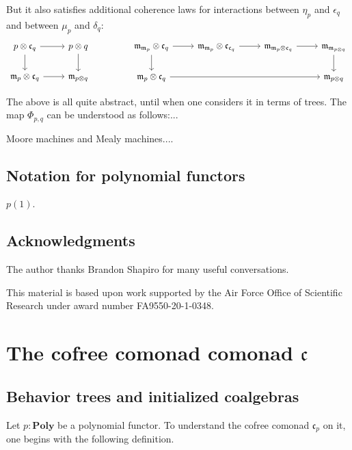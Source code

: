 \documentclass[11pt, one side, article]{memoir}
\theoremstyle{definition}
\theoremstyle{plain}
\newcommand{\Cat}[1]{\mathbf{#1}}%
\newcommand{\poly}{\Cat{Poly}}
\newcommand{\free}{\mathfrak{m}}
\newcommand{\cofree}{\mathfrak{c}}
\begin{document}
But it also satisfies additional coherence laws for interactions between $\eta_p$ and $\epsilon_q$ and between $\mu_p$ and $\delta_q$:
\[
\begin{tikzcd}
  p\otimes\cofree_q\ar[r]\ar[d]&p\otimes q\ar[d]\\
  \free_p\otimes\cofree_q\ar[r]&\free_{p\otimes q}
\end{tikzcd}
\hspace{.6in}
\begin{tikzcd}
	\free_{\free_p}\otimes\cofree_q\ar[d]\ar[r]&
	\free_{\free_p}\otimes\cofree_{\cofree_q}\ar[r]&
	\free_{\free_p\otimes\cofree_q}\ar[r]&
	\free_{\free_{p\otimes q}}\ar[d]\\
	\free_p\otimes\cofree_q\ar[rrr]&&&
	\free_{p\otimes q}
\end{tikzcd}
\]


The above is all quite abstract, until when one considers it in terms of trees. The map $\Phi_{p,q}$ can be understood as follows:...



Moore machines and Mealy machines....

\section{Notation for polynomial functors}

$p(1)$.

\section*{Acknowledgments}
The author thanks Brandon Shapiro for many useful conversations.

This material is based upon work supported by the Air Force Office of Scientific Research under award number FA9550-20-1-0348.

\chapter{The cofree comonad comonad $\cofree$}

\section{Behavior trees and initialized coalgebras}

Let $p:\poly$ be a polynomial functor. To understand the cofree comonad $\cofree_p$ on it, one begins with the following definition.
\end{document}
